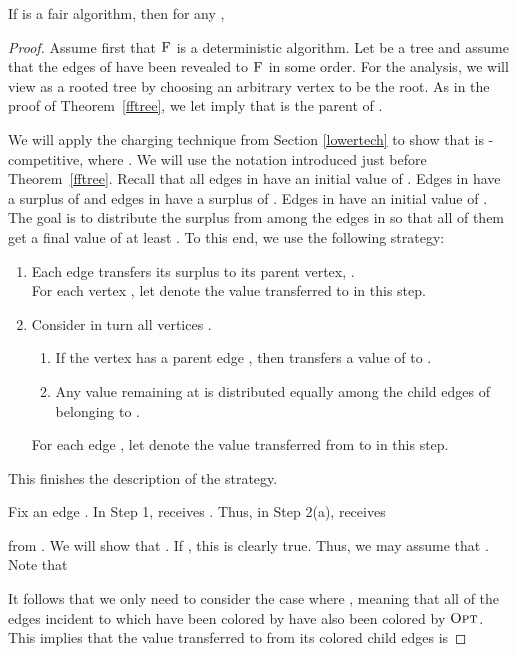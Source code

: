 \documentclass[smallextended]{svjour3}
\newcommand{\OPT}{\ensuremath{\operatorname{\textsc{Opt}}}\xspace}
\newcommand{\FAIR}{\ensuremath{\operatorname{\textsc{F}}}\xspace}
\begin{document}
\begin{theorem}
\label{lowktree}
If  is a fair algorithm, then for any ,

\end{theorem}
\begin{proof}
Assume first that \FAIR is a deterministic algorithm.
Let  be a tree and assume that the edges of  have been revealed to \FAIR in some order. 
For the analysis, we will view  as a rooted tree by choosing an arbitrary vertex to be the root. 
As in the proof of Theorem~\ref{fftree}, we let  imply that  is the parent of .

We will apply the charging technique from Section \ref{lowertech} to show that  is -competitive, where . 
We will use the notation introduced 
just before Theorem~\ref{fftree}.
Recall that all edges in  have an initial value of . Edges in  have a surplus of  and edges in  have a surplus of . Edges in  have an initial value of . The goal is to distribute the surplus from  among the edges in  so that all of them get a final value of at least . To this end, we use the following strategy: 

\begin{enumerate}[Step 1:]
\item  Each edge  transfers its surplus to its
  parent vertex, .\\
 For each vertex , let  denote the value transferred to 
  in this step. 
\item Consider in turn all vertices . 
  \begin{enumerate}
  \item If the vertex  has a parent edge , then  transfers a
    value of  to .
  \item Any value remaining at  is distributed equally among the
    child edges of  belonging to .
  \end{enumerate}
  For each edge , let  denote the value transferred from  to  in this step.
\end{enumerate}
This finishes the description of the strategy. 

Fix an edge . 
In Step 1,  receives .
Thus, in Step 2(a),  receives 
 
from .
We will show that . 
If , this is clearly true.
Thus, we may assume that .
Note that

It follows that we only need to consider the case where , meaning that all of the edges incident to  which have been colored by  have also been colored by \OPT. This implies that the value transferred to  from its colored child edges is  
  

\end{proof}
\end{document}

